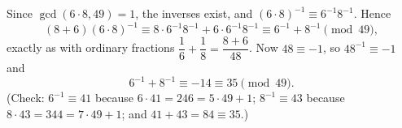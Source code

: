 Since $\gcd(6\cdot8,49)=1$, the inverses exist, and $(6\cdot8)^{-1}\equiv6^{-1}8^{-1}$. Hence
\[(8+6)(6\cdot8)^{-1}\equiv8\cdot6^{-1}8^{-1}+6\cdot6^{-1}8^{-1}\equiv6^{-1}+8^{-1}\pmod{49},\]
exactly as with ordinary fractions $\dfrac16+\dfrac18=\dfrac{8+6}{48}$. Now $48\equiv-1$, so $48^{-1}\equiv-1$ and
\[6^{-1}+8^{-1}\equiv-14\equiv\boxed{35}\pmod{49}.\]
(Check: $6^{-1}\equiv41$ because $6\cdot41=246=5\cdot49+1$; $8^{-1}\equiv43$ because $8\cdot43=344=7\cdot49+1$; and $41+43=84\equiv35$.)
